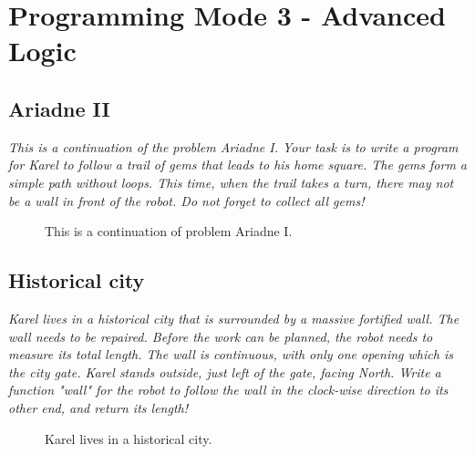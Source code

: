 \section{Programming Mode 3 - Advanced Logic}

\subsection{Ariadne II}

{\em This is a continuation of the problem Ariadne I. Your task is to write a program for Karel to follow a trail of gems that leads to his home square. The gems form a simple path without loops. This time, when the trail takes a turn, there may not be a wall in front of the robot. Do not forget to collect all gems!}

\begin{figure}[!ht]
\begin{center}
\vspace{6cm}
\end{center}
\vspace{-4mm}
\caption{This is a continuation of problem Ariadne I.}
\label{fig:g10b}
\end{figure}

\newpage

\subsection{Historical city}

{\em Karel lives in a historical city that is surrounded by a massive fortified wall. The wall needs to be repaired. Before the work can be planned, the robot needs to measure its total length. The wall is continuous, with only one opening which is the city gate. Karel stands outside, just left of the gate, facing North. Write a function "wall" for the robot to follow the wall in the clock-wise direction to its other end, and return its length!  }

\begin{figure}[!ht]
\begin{center}
\vspace{6cm}
\end{center}
\vspace{-4mm}
\caption{Karel lives in a historical city.}
\label{fig:g10c}
\end{figure}

